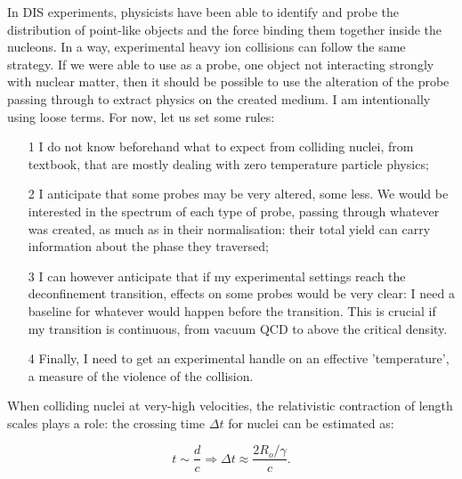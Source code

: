 In DIS experiments, physicists have been able to identify and %
probe the distribution of point-like objects and the force
binding them together inside the nucleons. In a way, experimental
heavy ion collisions can follow the same strategy. If we were able to
use as a probe, one object not interacting strongly with nuclear matter,
then it should be possible to use the alteration of
the probe passing through to extract physics on the created medium. I am intentionally using loose terms.
For now, let us set some rules:
\begin{itemize}
\item[1] I do not know beforehand what to expect from colliding nuclei, from
  textbook, that are mostly dealing with zero temperature particle physics;%
  
\item[2] I anticipate that some probes may be
  very altered, some less. We would be interested in the spectrum of each
 type of probe, passing through whatever was created, as much as 
  in their normalisation: their total yield can carry information about the phase they traversed;
\item[3] I can however anticipate that if my experimental settings
  reach the deconfinement transition, effects on some probes would be very clear: I need a baseline for whatever would happen before
  the transition. This is crucial if my transition is continuous, from
  vacuum QCD to above the critical density.
\item[4] Finally, I need to get an experimental handle on an effective
  'temperature', a measure of the violence of the collision.
\end{itemize}
 
When colliding nuclei at very-high velocities, the relativistic
contraction of length scales plays a role: the crossing time $\Delta t$ for nuclei can
be estimated as:

\begin{equation}
t \sim \frac{d}{c} \Longrightarrow \Delta t \approx
\frac{2R_{o}/\gamma}{c}.
\end{equation}

